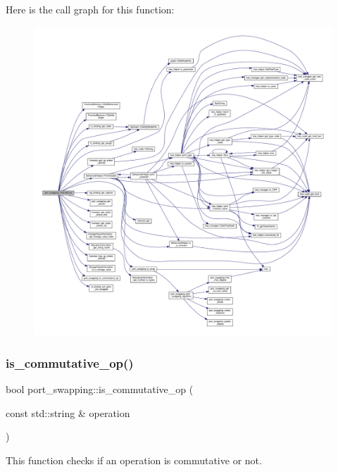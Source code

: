 Here is the call graph for this function\+:
\nopagebreak
\begin{figure}[H]
\begin{center}
\leavevmode
\includegraphics[width=350pt]{d6/d83/classport__swapping_afb48fd23dc4e2bc8f38fe50a4cc9f0e5_cgraph}
\end{center}
\end{figure}
\mbox{\label{classport__swapping_ad546fd3baa65c843d4cf7619cc666cb7}} 
\subsubsection{\texorpdfstring{is\+\_\+commutative\+\_\+op()}{is\_commutative\_op()}}
{\footnotesize\ttfamily bool port\+\_\+swapping\+::is\+\_\+commutative\+\_\+op (\begin{DoxyParamCaption}\item[{const std\+::string \&}]{operation }\end{DoxyParamCaption})}



This function checks if an operation is commutative or not. 


